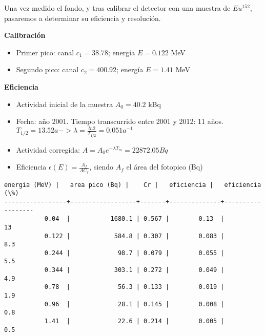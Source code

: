 \documentclass[11pt]{article}
\begin{document}
Una vez medido el fondo, y tras calibrar el detector con una muestra de
\(Eu^{152}\), pasaremos a determinar su eficiencia y resolución.

    \textbf{Calibración}

\begin{itemize}
\item
  Primer pico: canal \(c_1 = 38.78\); energía \(E = 0.122\) MeV
\item
  Segundo pico: canal \(c_2 = 400.92\); energía \(E = 1.41\) MeV
\end{itemize}

\textbf{Eficiencia}

\begin{itemize}
\item
  Actividad inicial de la muestra \(A_0 = 40.2\) kBq
\item
  Fecha: año 2001. Tiempo transcurrido entre 2001 y 2012: 11 años.
  \(T_{1/2} = 13.52 a -> \lambda = \frac{ln2}{T_{1/2}} = 0.051 a^{-1}\)
\item
  Actividad corregida: \(A = A_0e^{- \lambda T_m} = 22872.05 Bq\)
\item
  Eficiencia \(\epsilon (E) = \frac{A_f}{AC_r}\), siendo \(A_f\) el área
  del fotopico (Bq)
\end{itemize}

    \begin{Verbatim}[commandchars=\\\{\}]
   energia (MeV) |   area pico (Bq) |    Cr |   eficiencia |   eficiencia (\%)
-----------------+------------------+-------+--------------+------------------
           0.04  |           1680.1 | 0.567 |        0.13  |             13
           0.122 |            584.8 | 0.307 |        0.083 |              8.3
           0.244 |             98.7 | 0.079 |        0.055 |              5.5
           0.344 |            303.1 | 0.272 |        0.049 |              4.9
           0.78  |             56.3 | 0.133 |        0.019 |              1.9
           0.96  |             28.1 | 0.145 |        0.008 |              0.8
           1.41  |             22.6 | 0.214 |        0.005 |              0.5
    \end{Verbatim}

    \begin{center}
    \end{center}
    { \hspace*{\fill} \\}
    
\end{document}
